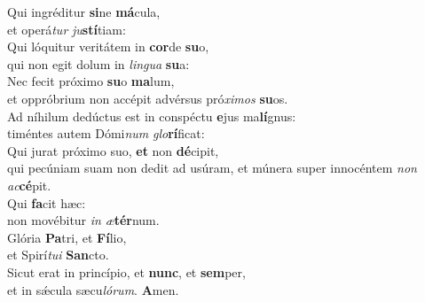 \evenverse Qui ingréditur \textbf{si}ne \textbf{má}cula,~\*\\
\evenverse et operá\textit{tur} \textit{ju}\textbf{stí}tiam:\\
\oddverse Qui lóquitur veritátem in \textbf{cor}de \textbf{su}o,~\*\\
\oddverse qui non egit dolum in \textit{lin}\textit{gua} \textbf{su}a:\\
\evenverse Nec fecit próximo \textbf{su}o \textbf{ma}lum,~\*\\
\evenverse et oppróbrium non accépit advérsus pró\textit{xi}\textit{mos} \textbf{su}os.\\
\oddverse Ad níhilum dedúctus est in conspéctu \textbf{e}jus ma\textbf{lí}gnus:~\*\\
\oddverse timéntes autem Dómi\textit{num} \textit{glo}\textbf{rí}ficat:\\
\evenverse Qui jurat próximo suo, \textbf{et} non \textbf{dé}cipit,~\*\\
\evenverse qui pecúniam suam non dedit ad usúram, et múnera super innocéntem \textit{non} \textit{ac}\textbf{cé}pit.\\
\oddverse Qui \textbf{fa}cit hæc:~\*\\
\oddverse non movébitur \textit{in} \textit{æ}\textbf{tér}num.\\
\evenverse Glória \textbf{Pa}tri, et \textbf{Fí}lio,~\*\\
\evenverse et Spirí\textit{tu}\textit{i} \textbf{San}cto.\\
\oddverse Sicut erat in princípio, et \textbf{nunc}, et \textbf{sem}per,~\*\\
\oddverse et in sǽcula sæcu\textit{ló}\textit{rum}. \textbf{A}men.\\
